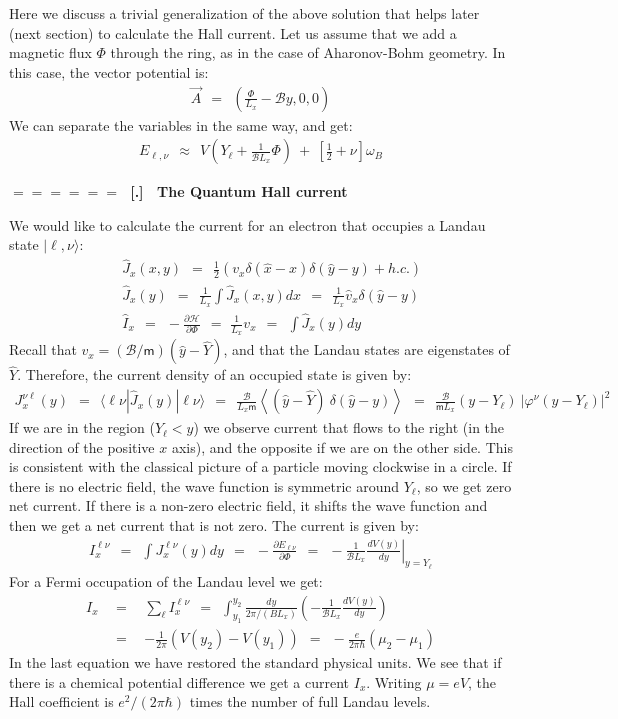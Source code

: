 \documentclass[onecolumn,fleqn]{revtex4}
\newcommand{\mass}{\mathsf{m}}
\newcommand{\beq}{\begin{eqnarray}}
\newcommand{\eeq}{\end{eqnarray}}
\renewcommand{\thesubsection}{\arabic{subsection}}
\renewcommand{\thesubsubsection}{\arabic{subsubsection}}
\newcommand{\sheadC}[1]
{
\addtocounter{subsubsection}{1}
\vspace{5mm}
{\Large\bf $=\!=\!=\!=\!=\!=\;$ [\thesubsection.\thesubsubsection] \ #1}  
\nopagebreak
\phantomsection
}
\begin{document}
Here we discuss a trivial generalization 
of the above solution that helps later (next section) 
to calculate the Hall current. 
Let us assume that we add a magnetic flux ${\Phi}$ through the ring, 
as in the case of Aharonov-Bohm geometry. In this case, 
the vector potential is:
\beq
\vec{A} \ \ = \ \ \left(\frac{\Phi}{L_x}-\mathcal{B}y ,0,0\right) 
\eeq
We can separate the variables in the same way, and get:
\beq
E_{\ell,\nu} \ \ \approx \ \ V\left( Y_{\ell}
+ \frac{1}{\mathcal{B}L_x} \Phi \right ) 
\ + \ \left[ \frac{1}{2} + \nu \right] \omega_B 
\eeq





\sheadC{The Quantum Hall current}

We would like to calculate the current for an electron 
that occupies a Landau state ${| \ell, \nu \rangle}$:
\beq
&& \hat{J}_{x}(x,y) 
\ \ = \ \ 
\frac{1}{2}(v_x\delta(\hat{x}-x)\delta (\hat{y}-y)+h.c.) 
\\ \nonumber
&& \hat{J}_{x}(y) 
\ \ = \ \ 
\frac{1}{L_x} \int{\hat{J}_x(x,y) dx} 
\ \ = \ \ 
\frac{1}{L_x} \hat{v}_x \delta (\hat{y}-y) 
\\ \nonumber
&& \hat{I}_{x} 
\ \ = \ \ 
- \frac{\partial \mathcal{H}}{ \partial \Phi } 
\ \ = \,\,
\frac{1}{L_x}v_x
\ \ = \ \ 
\int \hat{J}_x(y) dy 
\eeq
Recall that ${v_x = (\mathcal{B}/\mass) (\hat{y}-\hat{Y})}$,  
and that the Landau states are eigenstates of ${\hat{Y}}$. 
Therefore, the current density of an occupied state is given by:
\beq
J_{x}^{\nu \ell}(y) 
\ \ = \ \ \langle {\ell\nu} | \hat{J}_{x}(y) | \ell \nu \rangle
\ \ = \ \ \frac{\mathcal{B} }{L_x\mass} 
\left\langle (\hat{y}-\hat{Y}) \ 
\delta (\hat{y}-y) \right \rangle 
\ \ = \ \ \frac{\mathcal{B} }{\mass L_x } (y-Y_{\ell}) \ 
\left| \varphi^{\nu}(y-Y_{\ell}) \right|^2 
\eeq
If we are in the region (${Y_{\ell}<y}$) we observe 
current that flows to the right (in the direction of the positive $x$ axis), 
and the opposite if we are on the other side. This is consistent 
with the classical picture of a particle moving clockwise in a circle. 
If there is no electric field, the wave function is symmetric 
around ${Y_{\ell}}$, so we get zero net current. 
If there is a non-zero electric field, it shifts the wave 
function and then we get a net current that is not zero. 
The current is given by:
\beq
I^{\ell\nu}_x \ \ = \ \ \int J^{\ell\nu}_x(y) dy 
\ \ = \ \ -\frac{\partial{E_{\ell\nu}}}{ \partial{\Phi} }
\ \ = \ \ - \frac{ 1 }{\mathcal{B}L_x} \left. \frac{dV(y)}{dy} \right|_{y=Y_{\ell}} 
\eeq
For a Fermi occupation of the Landau level we get:
\beq
I_{x} & \ \ = \ \ & \sum_{\ell} I_{x}^{\ell\nu}
\ \ = \ \ \int_{ y_1}^{y_2} \frac{dy } { 2\pi / (BL_x) } \left( - \frac{1}{\mathcal{B}L_x} \frac{ dV(y) } { dy } \right ) 
\\ \nonumber
& \ \ = \ \ & - \frac{1}{ 2\pi } (V(y_2)-V(y_1)) 
\ \ = \ \ - \frac{e}{2\pi\hbar} (\mu_2-\mu_1) 
\eeq
In the last equation we have restored the standard physical units. 
We see that if there is a chemical potential difference we get 
a current ${I_x}$. Writing $\mu=eV$, the Hall coefficient 
is ${e^2/(2\pi\hbar)}$ times the number of full Landau levels. 
\end{document}
